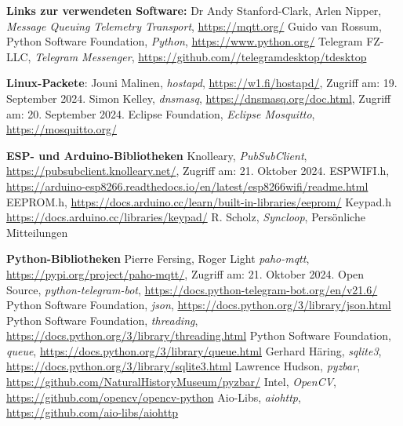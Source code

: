 \documentclass[12pt, letterpaper]{article}
\begin{document}
\begin{thebibliography}{20}
  \par \textbf{Links zur verwendeten Software:}
  Dr Andy Stanford-Clark, Arlen Nipper, \textit{Message Queuing Telemetry Transport}, \url{https://mqtt.org/}
  Guido van Rossum, Python Software Foundation, \textit{Python}, \url{https://www.python.org/}
  Telegram FZ-LLC, \textit{Telegram Messenger}, \url{https://github.com//telegramdesktop/tdesktop}
  \par \textbf{Linux-Packete}:
  Jouni Malinen, \textit{hostapd}, \url{https://w1.fi/hostapd/}, Zugriff am: 19. September 2024.
  Simon Kelley, \textit{dnsmasq}, \url{https://dnsmasq.org/doc.html}, Zugriff am: 20. September 2024.
  Eclipse Foundation, \textit{Eclipse Mosquitto}, \url{https://mosquitto.org/}
  \par \textbf{ESP- und Arduino-Bibliotheken}
  Knolleary, \textit{PubSubClient}, \url{https://pubsubclient.knolleary.net/}, Zugriff am: 21. Oktober 2024.
  ESPWIFI.h, \url{https://arduino-esp8266.readthedocs.io/en/latest/esp8266wifi/readme.html}
  EEPROM.h, \url{https://docs.arduino.cc/learn/built-in-libraries/eeprom/}
  Keypad.h \url{https://docs.arduino.cc/libraries/keypad/}
  R. Scholz, \textit{Syncloop}, Persönliche Mitteilungen
  \par \textbf{Python-Bibliotheken}
  Pierre Fersing, Roger Light \textit{paho-mqtt}, \url{https://pypi.org/project/paho-mqtt/}, Zugriff am: 21. Oktober 2024.
  Open Source, \textit{python-telegram-bot}, \url{https://docs.python-telegram-bot.org/en/v21.6/}
  Python Software Foundation, \textit{json}, \url{https://docs.python.org/3/library/json.html}
  Python Software Foundation, \textit{threading}, \url{https://docs.python.org/3/library/threading.html}
  Python Software Foundation, \textit{queue}, \url{https://docs.python.org/3/library/queue.html}
  Gerhard Häring, \textit{sqlite3}, \url{https://docs.python.org/3/library/sqlite3.html}
  Lawrence Hudson, \textit{pyzbar}, \url{https://github.com/NaturalHistoryMuseum/pyzbar/}
  Intel, \textit{OpenCV}, \url{https://github.com/opencv/opencv-python}
  Aio-Libs, \textit{aiohttp}, \url{https://github.com/aio-libs/aiohttp}
\end{thebibliography}
\end{document}
